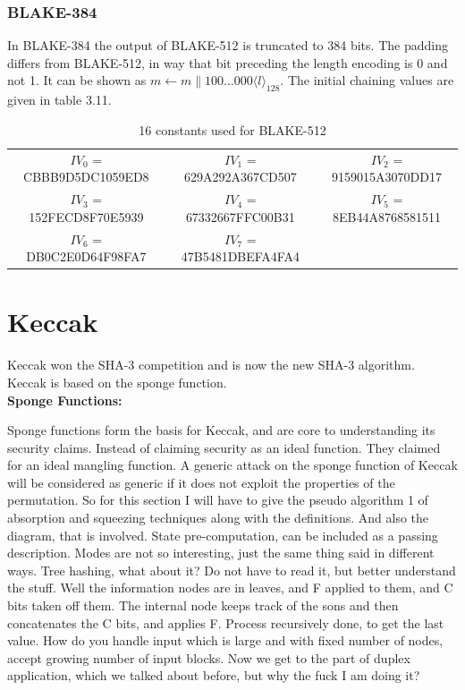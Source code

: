   \subsubsection{BLAKE-384}
  In BLAKE-384 the output of BLAKE-512 is truncated to 384 bits. The padding differs from BLAKE-512, in way that bit
  preceding the length encoding is 0 and not 1. It can be shown as $m \gets m \parallel 100 \dots 000 \langle l \rangle_{128}$. The
  initial chaining values are given in table 3.11.
  \begin{table}[h]
    \begin{center}
      \begin{tabular}{ *{3}{c}}
        $IV_{0}$  = CBBB9D5DC1059ED8 & $IV_{1}$  = 629A292A367CD507 & $IV_{2}$  = 9159015A3070DD17 \\
        $IV_{3}$  = 152FECD8F70E5939 & $IV_{4}$  = 67332667FFC00B31 & $IV_{5}$  = 8EB44A8768581511 \\
        $IV_{6}$  = DB0C2E0D64F98FA7 & $IV_{7}$  = 47B5481DBEFA4FA4 &                             \\
      \end{tabular}
      \caption{16 constants used for BLAKE-512}
    \end{center}
  \end{table}

\section{Keccak}
Keccak won the SHA-3 competition and is now the new SHA-3 algorithm. Keccak is based on the sponge function.
\cite{00015} \\

  {\bf Sponge Functions:} \cite{00016}

  Sponge functions form the basis for Keccak, and are core to understanding its security claims. Instead of claiming 
  security as an ideal function. They claimed for an ideal mangling function. A generic attack on the sponge function 
  of Keccak will be considered as generic if it does not exploit the properties of the permutation. So for this section
  I will have to give the pseudo algorithm 1 of absorption and squeezing techniques along with the definitions. And also
  the diagram, that is involved. State pre-computation, can be included as a passing description. Modes are not so 
  interesting, just the same thing said in different ways. Tree hashing, what about it? Do not have to read it, but better
  understand the stuff. Well the information nodes are in leaves, and F applied to them, and C bits taken off them. The
  internal node keeps track of the sons and then concatenates the C bits, and applies F. Process recursively done, to get
  the last value. How do you handle input which is large and with fixed number of nodes, accept growing number of input blocks.
  Now we get to the part of duplex application, which we talked about before, but why the fuck I am doing it? 
